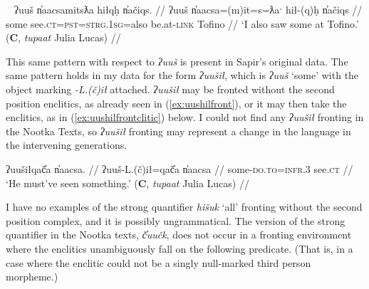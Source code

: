 \ex~ \label{ex:uushfrontnoclitic}
\begingl
\glpreamble ʔuuš n̓aacsamitsƛa hiłqḥ n̓ačiqs. //
\gla ʔuuš n̓aacsa=(m)it=s=ƛaˑ hił-(q)ḥ n̓ačiqs  //
\glb some see.\textsc{ct}=\textsc{pst}=\textsc{strg.1sg}=also be.at-\textsc{link} Tofino //
\glft `I also saw some at Tofino.' (\textbf{C}, \textit{tupaat} Julia Lucas) //
\endgl
\xe

This same pattern with respect to \textit{ʔuuš} is present in Sapir's original data.\footnotemark{} The same pattern holds in my data for the form \textit{ʔuušił}, which is \textit{ʔuuš} `some' with the object marking \textit{-L.(č)ił} attached. \textit{ʔuušił} may be fronted without the second position enclitics, as already seen in (\ref{ex:uushilfront}), or it may then take the enclitics, as in (\ref{ex:uushilfrontclitic}) below. I could not find any \textit{ʔuušił} fronting in the Nootka Texts, so \textit{ʔuušił} fronting may represent a change in the language in the intervening generations.


\ex \label{ex:uushilfrontclitic}
\begingl
\glpreamble ʔuušiłqač̓a n̓aacsa. //
\gla ʔuuš-L.(č)ił=qač̓a n̓aacsa  //
\glb some-\textsc{do.to}=\textsc{infr.3} see.\textsc{ct} //
\glft `He must've seen something.' (\textbf{C}, \textit{tupaat} Julia Lucas) //
\endgl
\xe

I have no examples of the strong quantifier \textit{hišuk} `all' fronting without the second position complex, and it is possibly ungrammatical. The version of the strong quantifier in the Nootka texts, \textit{č̓uučk}, does not occur in a fronting environment where the enclitics unambiguously fall on the following predicate. (That is, in a case where the enclitic could not be a singly null-marked third person morpheme.)

